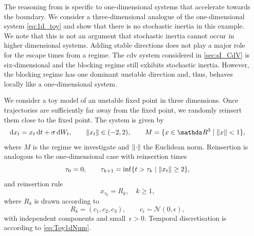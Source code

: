 The reasoning from \textcite{dorringtonInteractionStochasticForcing2023} is specific to one-dimensional systems that accelerate towards the boundary. We consider a three-dimensional analogue of the one-dimensional system \eqref{eq:1d_toy} and show that there is no stochastic inertia in this example. We note that this is not an argument that stochastic inertia cannot occur in higher dimensional systems. Adding stable directions does not play a major role for the escape times from a regime. The \gls{cdv} system considered in \cref{sec:sI_CdV} is six-dimensional and the blocking regime still exhibits stochastic inertia. However, the blocking regime has one dominant unstable direction and, thus, behaves locally like a one-dimensional system.

We consider a toy model of an unstable fixed point in three dimensions. Once trajectories are sufficiently far away from the fixed point, we randomly reinsert them close to the fixed point. The system is given by
\begin{equation}\label{eq:3d_toy}
    \mathrm{d}x_t = x_t\,\mathrm{d}t + \sigma\,\mathrm{d}W_t,\qquad \norm{x_t}\in(-2,2), \qquad M = \{ x\in \R^3 \mid \norm{x} < 1\},
\end{equation}
where $M$ is the regime we investigate and $\left\lVert\cdot\right\rVert$ the Euclidean norm. Reinsertion is analogous to the one-dimensional case with reinsertion times
\begin{equation}
    \tau_0=0,\qquad \tau_{k+1}=\inf\{t>\tau_k \mid \left\lVert x_t\right\rVert\ge 2\},
\end{equation}
and reinsertion rule
\begin{equation}
    x_{\tau_{k}} = R_k, \quad k\ge 1,
\end{equation}
where $R_k$ is drawn according to
\begin{equation}\label{eq:reinsertion3d}
    R_k = (c_1, c_2, c_3) , \qquad c_i \sim \mathcal{N}(0, \epsilon),
\end{equation}
with independent components and small~$\epsilon > 0$. Temporal discretisation is according to \cref{eq:Toy1dNum}.

